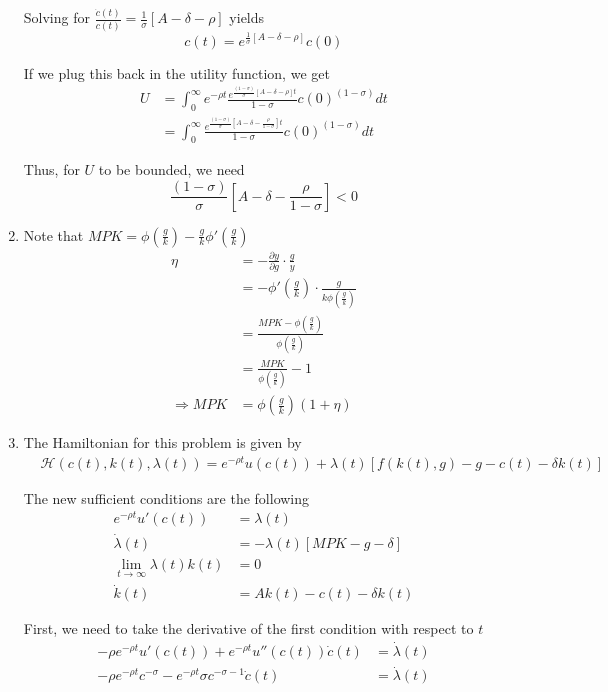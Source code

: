 \documentclass[12pt]{article}
\newcommand{\1}{{\bf 1}} %
\begin{document}
\begin{enumerate}[(1)]
	Solving for $\frac{\dot{c}(t)}{c(t)} = \frac{1}{\sigma} [A-\delta-\rho]$ yields
	\[
	c(t) = e^{\frac{1}{\sigma} [A-\delta-\rho]}c(0)
	\]
	
	If we plug this back in the utility function, we get
	\begin{align*}
	U & = \int_{0}^{\infty}e^{-\rho t} \frac{e^{\frac{(1-\sigma)}{\sigma} [A-\delta-\rho]t}}{1-\sigma}c(0)^{(1-\sigma)} dt \\
	& = \int_{0}^{\infty}\frac{e^{\frac{(1-\sigma)}{\sigma} [A-\delta-\frac{\rho}{1-\sigma}]t}}{1-\sigma}c(0)^{(1-\sigma)} dt 
	\end{align*}
	
	Thus, for $U$ to be bounded, we need
	\[
	\frac{(1-\sigma)}{\sigma} \left[ A-\delta-\frac{\rho}{1-\sigma}\right] <0
	\]
	\item 
	
	Note that $MPK=\phi\left(\frac{g}{k}\right) - \frac{g}{k}\phi'\left(\frac{g}{k}\right) $
	\begin{align*}
		\eta & = -\frac{\partial y}{\partial g} \cdot \frac{g}{y}\\
		& = -\phi'\left(\frac{g}{k}\right) \cdot \frac{g}{k \phi\left(\frac{g}{k}\right)}\\
		& =  \frac{MPK-\phi\left(\frac{g}{k}\right)}{ \phi\left(\frac{g}{k}\right)}\\
		& =  \frac{MPK}{ \phi\left(\frac{g}{k}\right)}-1\\
		\Rightarrow MPK &= \phi\left(\frac{g}{k}\right)(1+\eta)
	\end{align*}
	
	\item 
		The Hamiltonian for this problem is given by
	\begin{align*}
	&\mathcal{H}(c(t),k(t),\lambda(t)) = e^{-\rho t}u(c(t)) +\lambda(t)[f(k(t),g)-g-c(t)-\delta k(t)]
	\end{align*}
	
	The new sufficient conditions are the following
	\begin{align*}
	e^{-\rho t}u'(c(t)) & = \lambda(t)\\
	\dot{\lambda}(t) & = -\lambda(t) [MPK-g-\delta]\\
	\lim_{t\to \infty} \lambda(t) k(t) & = 0\\
	\dot{k}(t) & =Ak(t)-c(t)-\delta k(t)
	\end{align*}
	
	First, we need to take the derivative of the first condition with respect to $t$
	\begin{align*}
	-\rho e^{-\rho t}u'(c(t)) + e^{-\rho t}u''(c(t))\dot{c}(t) & = \dot{\lambda}(t)\\
	-\rho e^{-\rho t}c^{-\sigma}- e^{-\rho t} \sigma c^{-\sigma-1}\dot{c}(t) & = \dot{\lambda}(t)
	\end{align*}
	

\end{enumerate}
\end{document}
